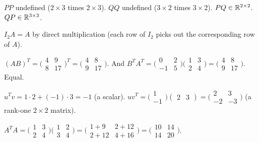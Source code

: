 \begin{solutions}
    \item $P P$ undefined ($2 \times 3$ times $2 \times 3$). $Q Q$ undefined ($3 \times 2$ times $3 \times 2$). $P Q \in \mathbb{R}^{2 \times 2}$. $Q P \in \mathbb{R}^{3 \times 3}$.

    \item $I_{2} A = A$ by direct multiplication (each row of $I_{2}$ picks out the corresponding row of $A$).

    \item $(A B)^{T} = \bigl(\begin{smallmatrix} 4 & 9 \\ 8 & 17 \end{smallmatrix}\bigr)^{T} = \bigl(\begin{smallmatrix} 4 & 8 \\ 9 & 17 \end{smallmatrix}\bigr)$. And $B^{T} A^{T} = \bigl(\begin{smallmatrix} 0 & 2 \\ -1 & 5 \end{smallmatrix}\bigr)\bigl(\begin{smallmatrix} 1 & 3 \\ 2 & 4 \end{smallmatrix}\bigr) = \bigl(\begin{smallmatrix} 4 & 8 \\ 9 & 17 \end{smallmatrix}\bigr)$. Equal.

    \item $u^{T} v = 1 \cdot 2 + (-1) \cdot 3 = -1$ (a scalar). $u v^{T} = \bigl(\begin{smallmatrix} 1 \\ -1 \end{smallmatrix}\bigr)\begin{pmatrix} 2 & 3 \end{pmatrix} = \bigl(\begin{smallmatrix} 2 & 3 \\ -2 & -3 \end{smallmatrix}\bigr)$ (a rank-one $2 \times 2$ matrix).

    \item $A^{T} A = \bigl(\begin{smallmatrix} 1 & 3 \\ 2 & 4 \end{smallmatrix}\bigr)\bigl(\begin{smallmatrix} 1 & 2 \\ 3 & 4 \end{smallmatrix}\bigr) = \bigl(\begin{smallmatrix} 1 + 9 & 2 + 12 \\ 2 + 12 & 4 + 16 \end{smallmatrix}\bigr) = \bigl(\begin{smallmatrix} 10 & 14 \\ 14 & 20 \end{smallmatrix}\bigr)$.


\end{solutions}
